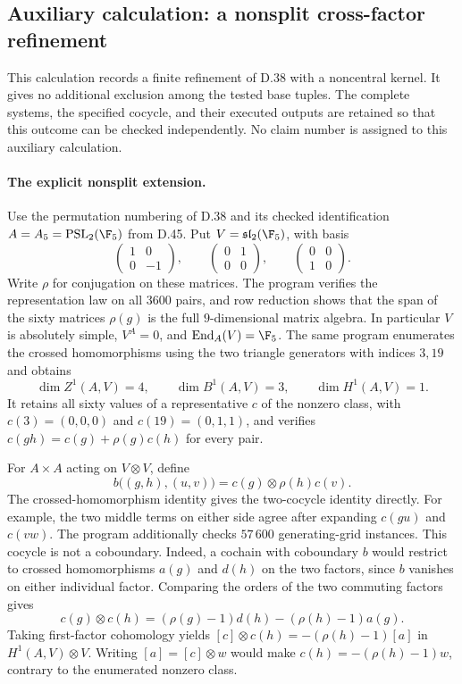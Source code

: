 \subsection*{Auxiliary calculation: a nonsplit cross-factor refinement}

This calculation records a finite refinement of D.38 with a noncentral
kernel.  It gives no additional exclusion among the tested base tuples.
The complete systems, the specified cocycle, and their executed outputs
are retained so that this outcome can be checked independently.
No claim number is assigned to this auxiliary calculation.

\paragraph{The explicit nonsplit extension.}
Use the permutation numbering of D.38 and its checked identification
$A=A_5=\operatorname{PSL}_2(\F_5)$ from D.45.  Put
$V=\mathfrak{sl}_2(\F_5)$, with basis
\[
 \begin{pmatrix}1&0\\0&-1\end{pmatrix},\qquad
 \begin{pmatrix}0&1\\0&0\end{pmatrix},\qquad
 \begin{pmatrix}0&0\\1&0\end{pmatrix}.
\]
Write $\rho$ for conjugation on these matrices.  The program
 verifies the representation law on
all $3600$ pairs, and row reduction shows that the span of the sixty
matrices $\rho(g)$ is the full $9$-dimensional matrix algebra.
In particular $V$ is absolutely simple, $V^A=0$, and
$\operatorname{End}_A(V)=\F_5$.
The same program enumerates the crossed homomorphisms using the two
triangle generators with indices $3,19$ and obtains
\[
 \dim Z^1(A,V)=4,\qquad \dim B^1(A,V)=3,
                 \qquad \dim H^1(A,V)=1.
\]
It retains all sixty values of a representative $c$ of the nonzero
class, with $c(3)=(0,0,0)$ and $c(19)=(0,1,1)$, and verifies
$c(gh)=c(g)+\rho(g)c(h)$ for every pair.

For $A\times A$ acting on $V\otimes V$, define
\[
 b\bigl((g,h),(u,v)\bigr)=c(g)\otimes\rho(h)c(v).       \tag{Aux.1}
\]
The crossed-homomorphism identity gives the two-cocycle identity
directly.  For example, the two middle terms on either side agree
after expanding $c(gu)$ and $c(vw)$.  The program additionally checks
$57\,600$ generating-grid instances.  This cocycle is not a
coboundary.  Indeed, a cochain with coboundary $b$ would restrict to
crossed homomorphisms $a(g)$ and $d(h)$ on the two factors, since
$b$ vanishes on either individual factor.  Comparing the orders of
the two commuting factors gives
\[
 c(g)\otimes c(h)=(\rho(g)-1)d(h)-(\rho(h)-1)a(g).
\]
Taking first-factor cohomology yields
$[c]\otimes c(h)=-(\rho(h)-1)[a]$ in
$H^1(A,V)\otimes V$.  Writing $[a]=[c]\otimes w$ would make
$c(h)=-(\rho(h)-1)w$, contrary to the enumerated nonzero class.

